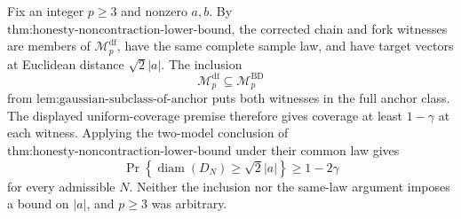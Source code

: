 Fix an integer \(p\ge3\) and nonzero \(a,b\).  By \(\text{thm:honesty-noncontraction-lower-bound}\), the corrected chain and fork witnesses are members of \(\mathcal M_p^{\mathrm{df}}\), have the same complete sample law, and have target vectors at Euclidean distance \(\sqrt2|a|\).  The inclusion
\[
 \mathcal M_p^{\mathrm{df}}\subseteq\mathcal M_p^{\mathrm{BD}}
\]
from \(\text{lem:gaussian-subclass-of-anchor}\) puts both witnesses in the full anchor class.  The displayed uniform-coverage premise therefore gives coverage at least \(1-\gamma\) at each witness.  Applying the two-model conclusion of \(\text{thm:honesty-noncontraction-lower-bound}\) under their common law gives
\[
 \Pr\!\left\{\operatorname{diam}(D_N)\ge\sqrt2|a|\right\}\ge1-2\gamma
\]
for every admissible \(N\).  Neither the inclusion nor the same-law argument imposes a bound on \(|a|\), and \(p\ge3\) was arbitrary.
